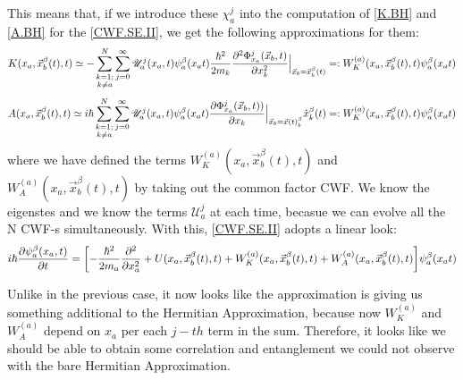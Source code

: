 \documentclass[11pt, a4paper]{article} %
\newcommand{\U}{\mathscr{U}}
\begin{document}
This means that, if we introduce these $\chi^j_a$ into the computation of \ref{K.BH} and \ref{A.BH} for the \ref{CWF.SE.II}, we get the following approximations for them:
$$
K(x_a, \vec{x}_b^\beta(t), t) \simeq - \sum_{\substack{k=1; \\ k\neq a}}^{N} \sum_{j=0}^\infty \U^j_a(x_a,t)\psi_a^\beta(x_a t) \frac{\hbar^2}{2m_k} \pdv[2]{ \Phi_{x_a}^j(\vec{x}_b,t)}{x_k}\Big\rvert_{\vec{x}_b=\vec{x}_b^\beta(t)}=:W_K^{(a)}(x_a, \vec{x}_b^\beta (t),t)\psi_a^\beta(x_a t)
$$
$$
A(x_a, \vec{x}_b^\beta(t), t) \simeq i \hbar \sum_{\substack{k=1; \\ k\neq a}}^{N} \sum_{j=0}^\infty \U^j_a(x_a,t)\psi_a^\beta(x_a t) \pdv{ \Phi_{x_a}^j(\vec{x}_b,t))}{x_k}\Big\rvert_{\vec{x}_b=\vec{x}(t)_b^\beta} \dot{x}_k^\beta(t)=:W_K^{(a)}(x_a, \vec{x}_b^\beta (t),t)\psi_a^\beta(x_a t)
$$
where we have defined the terms $W_K^{(a)}(x_a, \vec{x}_b^\beta (t),t)$ and $W_A^{(a)}(x_a, \vec{x}_b^\beta (t),t)$ by taking out the common factor CWF. We know the eigenstes and we know the terms $\U^j_a$ at each time, becasue we can evolve all the N CWF-s simultaneously. With this, \ref{CWF.SE.II} adopts a linear look:
$$
i\hbar \pdv{\psi_a^\beta(x_a, t)}{t} = \qty[- \frac{\hbar^2}{2m_a}\pdv[2]{}{x_a} + U(x_a, \vec{x}_b^\beta(t), t)+ W^{(a)}_K(x_a,\vec{x}_b^\beta (t),t) +W^{(a)}_A(x_a,\vec{x}_b^\beta (t),t) ]\psi_a^\beta(x_a t)
$$

Unlike in the previous case, it now looks like the approximation is giving us something additional to the Hermitian Approximation, because now $W^{(a)}_K$ and $W^{(a)}_A$ depend on $x_a$ per each $j-th$ term in the sum. Therefore, it looks like we should be able to obtain some correlation and entanglement we could not observe with the bare Hermitian Approximation.
\end{document}
